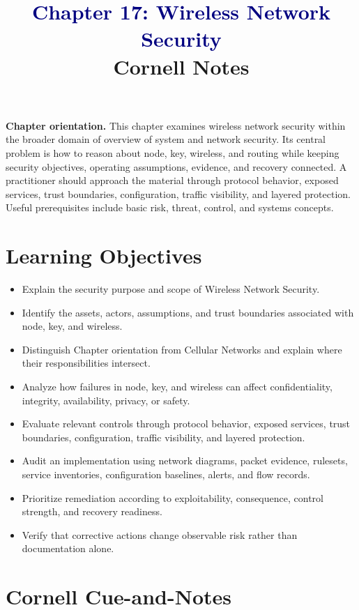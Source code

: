 \documentclass[11pt]{article}
\title{\textcolor{Navy}{Chapter 17: Wireless Network Security}\\[2mm]\large Cornell Notes}
\author{}
\date{}
\begin{document}
\maketitle
\thispagestyle{fancy}
\vspace{-1.5em}
\begin{orientationbox}
\textbf{Chapter orientation.} This chapter examines wireless network security within the broader domain of overview of system and network security. Its central problem is how to reason about node, key, wireless, and routing while keeping security objectives, operating assumptions, evidence, and recovery connected. A practitioner should approach the material through protocol behavior, exposed services, trust boundaries, configuration, traffic visibility, and layered protection. Useful prerequisites include basic risk, threat, control, and systems concepts.
\end{orientationbox}
\section*{Learning Objectives}
\begin{itemize}
\item Explain the security purpose and scope of Wireless Network Security.
\item Identify the assets, actors, assumptions, and trust boundaries associated with node, key, and wireless.
\item Distinguish Chapter orientation from Cellular Networks and explain where their responsibilities intersect.
\item Analyze how failures in node, key, and wireless can affect confidentiality, integrity, availability, privacy, or safety.
\item Evaluate relevant controls through protocol behavior, exposed services, trust boundaries, configuration, traffic visibility, and layered protection.
\item Audit an implementation using network diagrams, packet evidence, rulesets, service inventories, configuration baselines, alerts, and flow records.
\item Prioritize remediation according to exploitability, consequence, control strength, and recovery readiness.
\item Verify that corrective actions change observable risk rather than documentation alone.
\end{itemize}
\section*{Cornell Cue-and-Notes}
\end{document}
